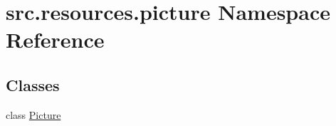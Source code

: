 \hypertarget{namespacesrc_1_1resources_1_1picture}{\section{src.\+resources.\+picture Namespace Reference}
\label{namespacesrc_1_1resources_1_1picture}
}
\subsection*{Classes}
\begin{DoxyCompactItemize}
\item 
class \hyperlink{classsrc_1_1resources_1_1picture_1_1_picture}{Picture}
\end{DoxyCompactItemize}
